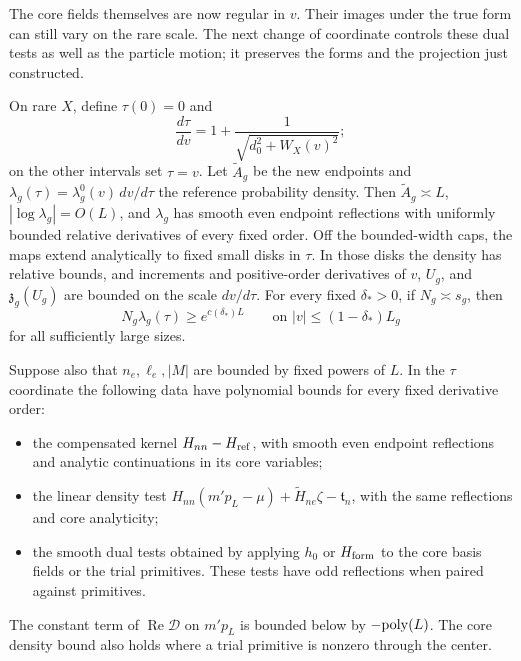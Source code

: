The core fields themselves are now regular in $v$. Their images under
the true form can still vary on the rare scale. The next change of
coordinate controls these dual tests as well as the particle motion;
it preserves the forms and the projection just constructed.


\begin{lemma}\label{lem:07_magnetic_analysis-stretch}
On rare $X$, define $\tau(0)=0$ and
\[
 \frac{d\tau}{dv}=1+\frac1{\sqrt{d_0^2+W_X(v)^2}};
\]
on the other intervals set $\tau=v$. Let $\widetilde A_g$ be the
new endpoints and $\lambda_g(\tau)=\lambda_g^0(v)\,dv/d\tau$ the
reference probability density. Then $\widetilde A_g\asymp L$,
$|\log\lambda_g|=O(L)$, and $\lambda_g$ has smooth even endpoint
reflections with uniformly bounded relative derivatives of every
fixed order. Off the bounded-width caps, the maps extend analytically
to fixed small disks in $\tau$. In those disks the density has relative
bounds, and increments and positive-order derivatives of $v$, $U_g$,
and $\mathfrak z_g(U_g)$ are bounded on the scale $dv/d\tau$.
For every fixed $\delta_*>0$, if $N_g\asymp s_g$, then
\begin{equation}\label{eq:M-33}
 N_g\lambda_g(\tau)\ge e^{c(\delta_*)L}
 \qquad\text{on }|v|\le(1-\delta_*)L_g
\end{equation}
for all sufficiently large sizes.

Suppose also that $n_e,\ell_e,|M|$ are bounded by fixed powers of $L$.
In the $\tau$ coordinate the following data have polynomial bounds
for every fixed derivative order:
\begin{itemize}
\item the compensated kernel $H_{nn}-H_{\rm ref}$, with smooth even
endpoint reflections and analytic continuations in its core variables;
\item the linear density test
$H_{nn}(m'p_L-\mu)+\widetilde H_{ne}\zeta-\mathfrak t_n$, with the
same reflections and core analyticity;
\item the smooth dual tests obtained by applying $h_0$ or
$H_{\rm form}$ to the core basis fields or the trial primitives.
These tests have odd reflections when paired against primitives.
\end{itemize}
The constant term of $\operatorname{Re}\mathcal D$ on $m'p_L$ is
bounded below by $-{\rm poly}(L)$. The core density bound also holds
where a trial primitive is nonzero through the center.
\end{lemma}
